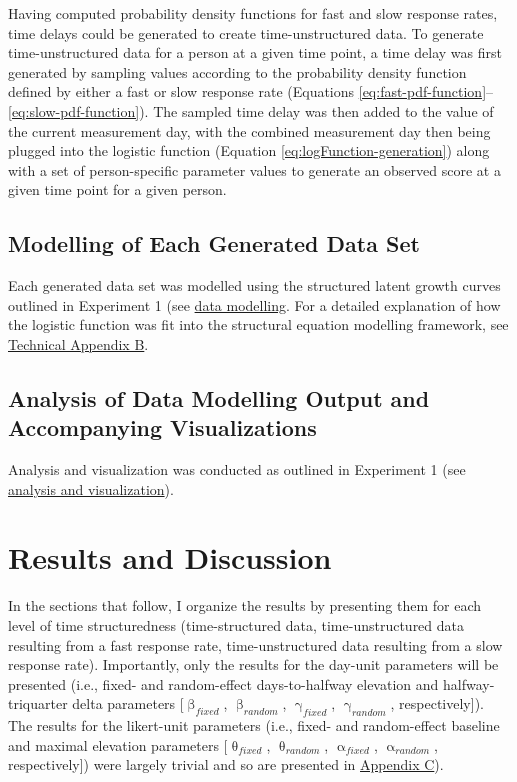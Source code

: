 \documentclass[
12pt, %
twoside,
english]{guelphthesis}
\begin{document}
Having computed probability density functions for fast and slow response rates, time delays could be generated to create time-unstructured data. To generate time-unstructured data for a person at a given time point, a time delay was first
generated by sampling values according to the probability density function defined by either a fast or slow response rate (Equations \ref{eq:fast-pdf-function}--\ref{eq:slow-pdf-function}). The sampled time delay was then added to the value of the current measurement day, with the combined measurement day then being plugged into the logistic function (Equation \ref{eq:logFunction-generation}) along with a set of person-specific parameter values to generate an observed score at a given time point for a given person.

\hypertarget{data-modelling-exp3}{%
\subsection{Modelling of Each Generated Data Set}\label{data-modelling-exp3}}

Each generated data set was modelled using the structured latent growth curves outlined in Experiment 1 (see \protect\hyperlink{data-modelling}{data modelling}. For a detailed explanation of how the logistic function was fit into the structural equation modelling framework, see \protect\hyperlink{structured-latent}{Technical Appendix B}.

\hypertarget{analysis-of-data-modelling-output-and-accompanying-visualizations-1}{%
\subsection{Analysis of Data Modelling Output and Accompanying Visualizations}\label{analysis-of-data-modelling-output-and-accompanying-visualizations-1}}

Analysis and visualization was conducted as outlined in Experiment 1 (see \protect\hyperlink{analysis-visualization}{analysis and visualization}).

\hypertarget{results-and-discussion-2}{%
\section{Results and Discussion}\label{results-and-discussion-2}}

In the sections that follow, I organize the results by presenting them for each level of time structuredness (time-structured data, time-unstructured data resulting from a fast response rate, time-unstructured data resulting from a slow response rate). Importantly, only the results for the day-unit parameters will be presented (i.e., fixed- and random-effect days-to-halfway elevation and halfway-triquarter delta parameters {[}\(\upbeta_{fixed}\), \(\upbeta_{random}\), \(\upgamma_{fixed}\), \(\upgamma_{random}\), respectively{]}). The results for the likert-unit parameters (i.e., fixed- and random-effect baseline and maximal elevation parameters {[}\(\uptheta_{fixed}\), \(\uptheta_{random}\), \(\upalpha_{fixed}\), \(\upalpha_{random}\), respectively{]}) were largely trivial and so are presented in \protect\hyperlink{appendix-c}{Appendix C}).
\end{document}
